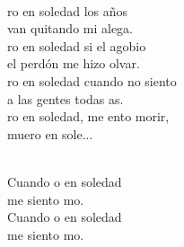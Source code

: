 \documentclass[12pt]{article}
\begin{document}
\begin{multicols*}{2}
\begin{cancion}
\begin{chorus}
	\end{chorus}%
	\jump\\
	ro en soledad los años  \\
	van quitando mi alega.\\
	ro en soledad si el agobio \\
	el perdón me hizo olvar.\\
	ro en soledad cuando no siento\\
	a las gentes todas as.\\
	ro en soledad, me ento morir, \\
	muero en sole...\\\jump\\
	\begin{chorus}%
	Cuando o en soledad \\
	me siento mo.\\
	Cuando o en soledad \\
	me siento mo. \\
	\end{chorus}%
	\jump\\
\end{cancion}%


\end{multicols*}
\end{document}
